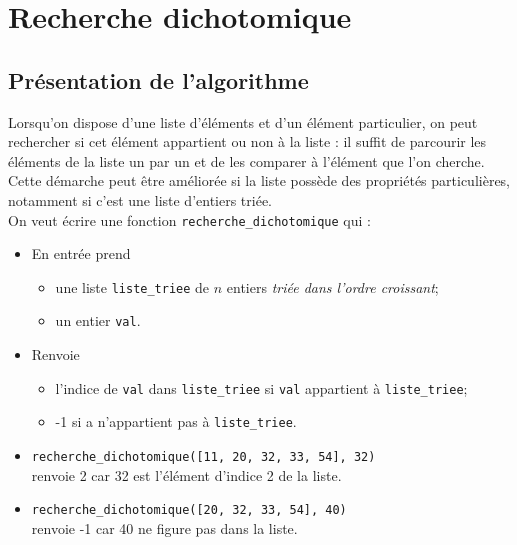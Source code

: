 \chapter{Recherche dichotomique}

\section{Présentation de l'algorithme}
Lorsqu'on dispose d'une liste d'éléments et d'un élément particulier, on peut rechercher si cet élément appartient ou non à la liste : il suffit de parcourir les éléments de la liste un par un et de les comparer à l'élément que l'on cherche. Cette démarche peut être améliorée si la liste possède des propriétés particulières, notamment si c'est une liste d'entiers triée.\\

On veut écrire une fonction \texttt{recherche\_dichotomique} qui :
\begin{itemize}
    \item   En entrée prend \begin{itemize}
                                \item   une liste \texttt{liste_triee} de $n$ entiers \textit{triée dans l'ordre croissant};
                                \item   un entier \texttt{val}.
                            \end{itemize}
    \item  Renvoie \begin{itemize}
                        \item   l'indice de \texttt{val} dans \texttt{liste_triee} si \texttt{val} appartient à \texttt{liste_triee};
                        \item   -1 si a n'appartient pas à \texttt{liste_triee}.
                    \end{itemize} 
\end{itemize}

\begin{exemple}[]
\begin{itemize}
    \item   \texttt{recherche_dichotomique([11, 20, 32, 33, 54], 32)} \\renvoie 2 car 32 est l'élément d'indice 2 de la liste.
    \item   \texttt{recherche_dichotomique([20, 32, 33, 54], 40)} \\renvoie -1 car 40 ne figure pas dans la liste.
\end{itemize}
\end{exemple}

